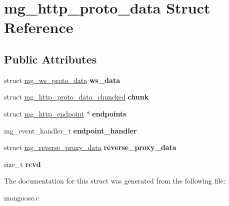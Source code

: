 \hypertarget{structmg__http__proto__data}{}\section{mg\+\_\+http\+\_\+proto\+\_\+data Struct Reference}
\label{structmg__http__proto__data}
\subsection*{Public Attributes}
\begin{DoxyCompactItemize}
\item 
\mbox{\label{structmg__http__proto__data_a25d8b118af48eb310e9e86e91ede75eb}} 
struct \hyperlink{structmg__ws__proto__data}{mg\+\_\+ws\+\_\+proto\+\_\+data} {\bfseries ws\+\_\+data}
\item 
\mbox{\label{structmg__http__proto__data_a36b052a8e6827001e15dd3e6aa38cbc9}} 
struct \hyperlink{structmg__http__proto__data__chuncked}{mg\+\_\+http\+\_\+proto\+\_\+data\+\_\+chuncked} {\bfseries chunk}
\item 
\mbox{\label{structmg__http__proto__data_a4c2bc1b9870ba96c459f4b5db1d3d5ed}} 
struct \hyperlink{structmg__http__endpoint}{mg\+\_\+http\+\_\+endpoint} $\ast$ {\bfseries endpoints}
\item 
\mbox{\label{structmg__http__proto__data_ad117a16e518b9752e3f2b9ab6dacc0e3}} 
mg\+\_\+event\+\_\+handler\+\_\+t {\bfseries endpoint\+\_\+handler}
\item 
\mbox{\label{structmg__http__proto__data_a5aab556501a2b7d27a44a87d51c86f8b}} 
struct \hyperlink{structmg__reverse__proxy__data}{mg\+\_\+reverse\+\_\+proxy\+\_\+data} {\bfseries reverse\+\_\+proxy\+\_\+data}
\item 
\mbox{\label{structmg__http__proto__data_a2c8c53d0cf1a36075bad3a4c4a3bb915}} 
size\+\_\+t {\bfseries rcvd}
\end{DoxyCompactItemize}


The documentation for this struct was generated from the following file\+:\begin{DoxyCompactItemize}
\item 
mongoose.\+c\end{DoxyCompactItemize}
